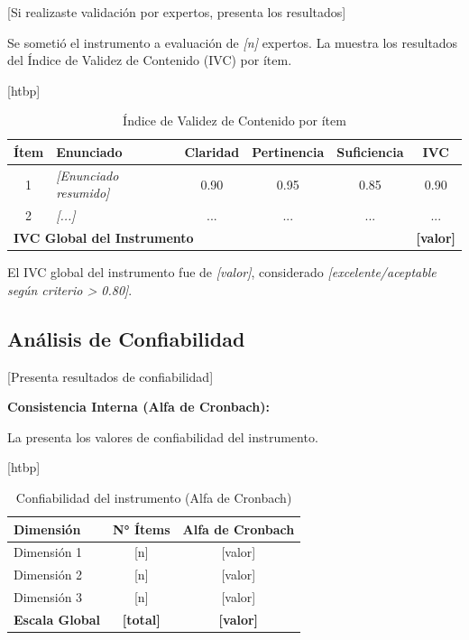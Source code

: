 {[Si realizaste validación por expertos, presenta los resultados]}

Se sometió el instrumento a evaluación de \textit{{[n]}} expertos. La  muestra los resultados del Índice de Validez de Contenido (IVC) por ítem.

\begin{table}{[htbp]}
    \centering
    \caption{Índice de Validez de Contenido por ítem}
    \label{tab:validacion_expertos}
    \small
    \begin{tabular}{@{}clcccc@{}}
        \toprule
        \textbf{Ítem} & \textbf{Enunciado} & \textbf{Claridad} & \textbf{Pertinencia} & \textbf{Suficiencia} & \textbf{IVC} \\
        \midrule
        1 & \textit{{[Enunciado resumido]}} & 0.90 & 0.95 & 0.85 & 0.90 \\
        2 & \textit{{[...]}} & ... & ... & ... & ... \\
        \midrule
        \multicolumn{5}{l}{\textbf{IVC Global del Instrumento}} & \textbf{{[valor]}} \\
        \bottomrule
    \end{tabular}
\end{table}

El IVC global del instrumento fue de \textit{{[valor]}}, considerado \textit{{[excelente/aceptable según criterio > 0.80]}}.

\subsection{Análisis de Confiabilidad}
\label{subsec:resultados_confiabilidad}

{[Presenta resultados de confiabilidad]}

\textbf{Consistencia Interna (Alfa de Cronbach):}

La  presenta los valores de confiabilidad del instrumento.

\begin{table}{[htbp]}
    \centering
    \caption{Confiabilidad del instrumento (Alfa de Cronbach)}
    \label{tab:alfa_cronbach}
    \begin{tabular}{@{}lcc@{}}
        \toprule
        \textbf{Dimensión} & \textbf{N° Ítems} & \textbf{Alfa de Cronbach} \\
        \midrule
        Dimensión 1 & {[n]} & {[valor]} \\
        Dimensión 2 & {[n]} & {[valor]} \\
        Dimensión 3 & {[n]} & {[valor]} \\
        \midrule
        \textbf{Escala Global} & \textbf{{[total]}} & \textbf{{[valor]}} \\
        \bottomrule
    \end{tabular}
\end{table}

